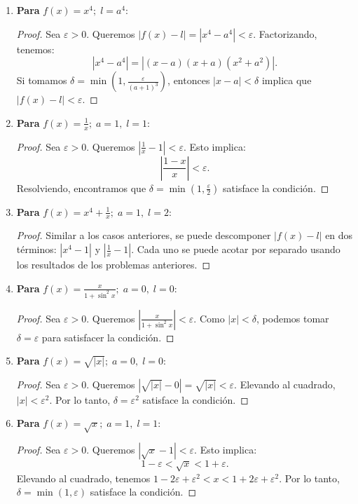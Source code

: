 \begin{enumerate}
    \item \textbf{Para } $f(x) = x^4; \; l = a^4$:
    \begin{proof}
    Sea $\varepsilon > 0$. Queremos $|f(x) - l| = |x^4 - a^4| < \varepsilon$. Factorizando, tenemos:
    \[
    |x^4 - a^4| = |(x-a)(x+a)(x^2 + a^2)|.
    \]
    Si tomamos $\delta = \min\left(1, \frac{\varepsilon}{(a+1)^3}\right)$, entonces $|x-a| < \delta$ implica que $|f(x) - l| < \varepsilon$.
    \end{proof}

    \item \textbf{Para } $f(x) = \frac{1}{x}; \; a = 1, \; l = 1$:
    \begin{proof}
    Sea $\varepsilon > 0$. Queremos $\left|\frac{1}{x} - 1\right| < \varepsilon$. Esto implica:
    \[
    \left|\frac{1-x}{x}\right| < \varepsilon.
    \]
    Resolviendo, encontramos que $\delta = \min\left(1, \frac{\varepsilon}{2}\right)$ satisface la condición.
    \end{proof}

    \item \textbf{Para } $f(x) = x^4 + \frac{1}{x}; \; a = 1, \; l = 2$:
    \begin{proof}
    Similar a los casos anteriores, se puede descomponer $|f(x) - l|$ en dos términos: $|x^4 - 1|$ y $\left|\frac{1}{x} - 1\right|$. Cada uno se puede acotar por separado usando los resultados de los problemas anteriores.
    \end{proof}

    \item \textbf{Para } $f(x) = \frac{x}{1 + \sin^2 x}; \; a = 0, \; l = 0$:
    \begin{proof}
    Sea $\varepsilon > 0$. Queremos $\left|\frac{x}{1 + \sin^2 x}\right| < \varepsilon$. Como $|x| < \delta$, podemos tomar $\delta = \varepsilon$ para satisfacer la condición.
    \end{proof}

    \item \textbf{Para } $f(x) = \sqrt{|x|}; \; a = 0, \; l = 0$:
    \begin{proof}
    Sea $\varepsilon > 0$. Queremos $|\sqrt{|x|} - 0| = \sqrt{|x|} < \varepsilon$. Elevando al cuadrado, $|x| < \varepsilon^2$. Por lo tanto, $\delta = \varepsilon^2$ satisface la condición.
    \end{proof}

    \item \textbf{Para } $f(x) = \sqrt{x}; \; a = 1, \; l = 1$:
    \begin{proof}
    Sea $\varepsilon > 0$. Queremos $|\sqrt{x} - 1| < \varepsilon$. Esto implica:
    \[
    1 - \varepsilon < \sqrt{x} < 1 + \varepsilon.
    \]
    Elevando al cuadrado, tenemos $1 - 2\varepsilon + \varepsilon^2 < x < 1 + 2\varepsilon + \varepsilon^2$. Por lo tanto, $\delta = \min(1, \varepsilon)$ satisface la condición.
    \end{proof}
\end{enumerate}

